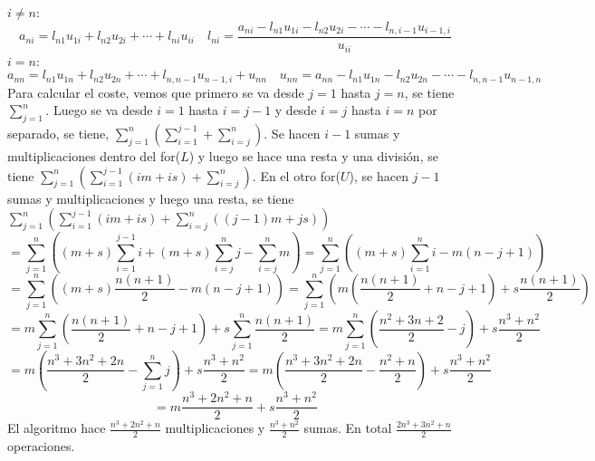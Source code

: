 \documentclass{article}
\begin{document}
$i\ne n$:
$$
a_{ni}=l_{n1}u_{1i}+l_{n2}u_{2i}+\cdots+l_{ni}u_{ii} \quad l_{ni}=\frac{a_{ni}-l_{n1}u_{1i}-l_{n2}u_{2i}-\cdots-l_{n,i-1}u_{i-1,i}}{u_{ii}}
$$
$i=n$:
$$
a_{nn}=l_{n1}u_{1n}+l_{n2}u_{2n}+\cdots+l_{n,n-1}u_{n-1,i}+u_{nn} \quad u_{nn}=a_{nn}-l_{n1}u_{1n}-l_{n2}u_{2n}-\cdots-l_{n,n-1}u_{n-1,n}
$$
Para calcular el coste, vemos que primero se va desde $j=1$ hasta $j=n$, se tiene $\sum_{j=1}^n$. Luego se va desde $i=1$ hasta $i=j-1$ y desde $i=j$ hasta $i=n$ por separado, se tiene, $\sum_{j=1}^n \left( \sum_{i=1}^{j-1} +\sum_{i=j}^n\right)$. Se hacen $i-1$ sumas y multiplicaciones dentro del for($L$) y luego se hace una resta y una división, se tiene $\sum_{j=1}^n \left( \sum_{i=1}^{j-1} (im + is) +\sum_{i=j}^n\right)$. En el otro for($U$), se hacen $j-1$ sumas y multiplicaciones y luego una resta, se tiene $\sum_{j=1}^n \left( \sum_{i=1}^{j-1} (im + is) +\sum_{i=j}^n ((j-1)m+js)\right)$
$$
=\sum_{j=1}^n \left( (m+s)\sum_{i=1}^{j-1}i +(m+s)\sum_{i=j}^nj-\sum_{i=j}^nm\right)
=\sum_{j=1}^n \left( (m+s)\sum_{i=1}^{n}i -m(n-j+1)\right)
$$
$$
=\sum_{j=1}^n \left( (m+s)\frac{n(n+1)}{2} -m(n-j+1)\right)
=\sum_{j=1}^n \left( m\left(\frac{n(n+1)}{2}+n-j+1\right)+s\frac{n(n+1)}{2} \right)
$$
$$
=m\sum_{j=1}^n\left(\frac{n(n+1)}{2}+n-j+1\right) + s\sum_{j=1}^n \frac{n(n+1)}{2}
=m\sum_{j=1}^n\left(\frac{n^2 + 3n + 2}{2}-j\right) + s \frac{n^3+n^2}{2}
$$
$$
=m\left(\frac{n^3 + 3n^2 + 2n}{2}-\sum_{j=1}^nj\right) + s \frac{n^3+n^2}{2}
=m\left(\frac{n^3 + 3n^2 + 2n}{2}-\frac{n^2+n}{2}\right) + s \frac{n^3+n^2}{2}
$$
$$
=m\frac{n^3 + 2n^2 + n}{2} + s \frac{n^3+n^2}{2}
$$
El algoritmo hace $\frac{n^3 + 2n^2 + n}{2}$ multiplicaciones y $\frac{n^3+n^2}{2}$ sumas. En total $\frac{2n^3 + 3n^2 + n}{2}$ operaciones.
\end{document}
